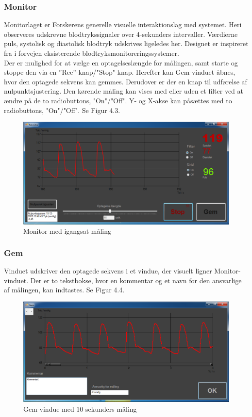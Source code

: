 \subsubsection{Monitor}
Monitorlaget er Forskerens generelle visuelle interaktionslag med systemet. Heri observeres udskrevne blodtrykssignaler over 4-sekunders intervaller. Værdierne puls, systolisk og diastolisk blodtryk udskrives ligeledes her. Designet er inspireret fra i forvejen eksisterende blodtryksmonitoreringssystemer. \\
Der er mulighed for at vælge en optagelseslængde for målingen, samt starte og stoppe den via en ”Rec”\--knap/"Stop"\--knap. Herefter kan Gem-vinduet åbnes, hvor den optagede sekvens kan gemmes. Derudover er der en knap til udførelse af nulpunktsjustering. Den kørende måling kan vises med eller uden et filter ved at ændre på de to radiobuttons, "On"\-/"Off". Y- og X-akse kan påsættes med to radiobuttons, "On"\-/"Off". Se Figur 4.3.
\begin{figure}[H]
	\centering
	\includegraphics[width=1\textwidth]{Figurer/Monitor_vindue_Recording}
	\caption{Monitor med igangsat måling}
\end{figure}

\subsubsection{Gem}
Vinduet udskriver den optagede sekvens i et vindue, der visuelt ligner Monitor-vinduet. Der er to tekstbokse, hvor en kommentar og et navn for den ansvarlige af målingen, kan indtastes. Se Figur 4.4.
\begin{figure}[H]
	\centering
	\includegraphics[width=1\textwidth]{Figurer/Gem}
	\caption{Gem-vindue med 10 sekunders måling}
\end{figure}

